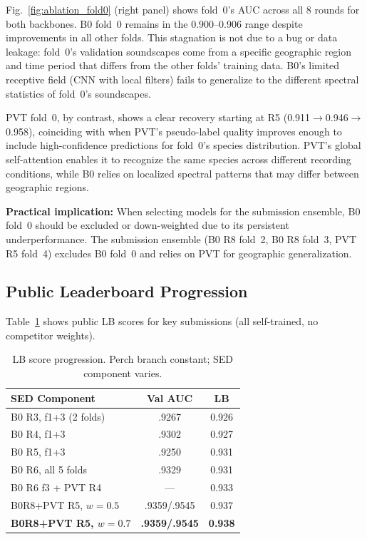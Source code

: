 \documentclass[journal]{IEEEtran}
\begin{document}
Fig.~\ref{fig:ablation_fold0} (right panel) shows fold~0's AUC across all 8 rounds for both backbones.
B0 fold~0 remains in the 0.900--0.906 range despite improvements in all other folds.
This stagnation is not due to a bug or data leakage: fold~0's validation soundscapes come from a specific geographic region and time period that differs from the other folds' training data.
B0's limited receptive field (CNN with local filters) fails to generalize to the different spectral statistics of fold~0's soundscapes.

PVT fold~0, by contrast, shows a clear recovery starting at R5 (0.911$\to$0.946$\to$0.958), coinciding with when PVT's pseudo-label quality improves enough to include high-confidence predictions for fold~0's species distribution.
PVT's global self-attention enables it to recognize the same species across different recording conditions, while B0 relies on localized spectral patterns that may differ between geographic regions.

\textbf{Practical implication:} When selecting models for the submission ensemble, B0 fold~0 should be excluded or down-weighted due to its persistent underperformance. The submission ensemble (B0 R8 fold~2, B0 R8 fold~3, PVT R5 fold~4) excludes B0 fold~0 and relies on PVT for geographic generalization.

\subsection{Public Leaderboard Progression}

Table~\ref{tab:lb} shows public LB scores for key submissions (all self-trained, no competitor weights).

\begin{table}[t]
\centering
\small
\caption{LB score progression. Perch branch constant; SED component varies.}
\label{tab:lb}
\begin{tabular}{lcc}
\toprule
\textbf{SED Component} & \textbf{Val AUC} & \textbf{LB} \\
\midrule
B0 R3, f1+3 (2 folds)    & .9267 & 0.926 \\
B0 R4, f1+3               & .9302 & 0.927 \\
B0 R5, f1+3               & .9250 & 0.931 \\
B0 R6, all 5 folds        & .9329 & 0.931 \\
B0 R6 f3 + PVT R4         & ---   & 0.933 \\
B0R8+PVT R5, $w=0.5$      & .9359/.9545 & 0.937 \\
\textbf{B0R8+PVT R5, $w=0.7$} & \textbf{.9359/.9545} & \textbf{0.938} \\
\bottomrule
\end{tabular}
\end{table}
\end{document}
